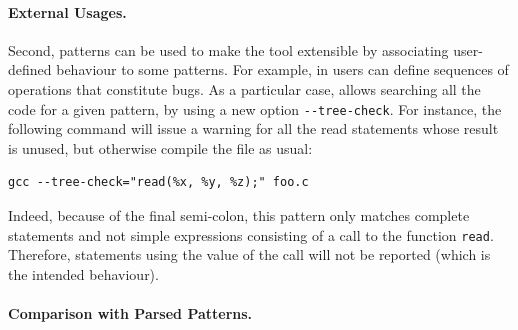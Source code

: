 \paragraph{External Usages.}

Second, patterns can be used to make the tool extensible by
associating user\hyp{}defined behaviour to some patterns. For example,
in \MyGCC users can define sequences of operations that constitute
bugs. As a particular case, \MyGCC allows searching all the code for a
given pattern, by using a new option \verb|--tree-check|. For
instance, the following command will issue a warning for all the read
statements whose result is unused, but otherwise compile the file as
usual:
\begin{verbatim}
gcc --tree-check="read(%x, %y, %z);" foo.c
\end{verbatim}
Indeed, because of the final semi\hyp{}colon, this pattern only
matches complete statements and not simple expressions consisting of a
call to the function \texttt{read}. Therefore, statements using the
value of the call will not be reported (which is the intended
behaviour).

\paragraph{Comparison with Parsed Patterns.}

